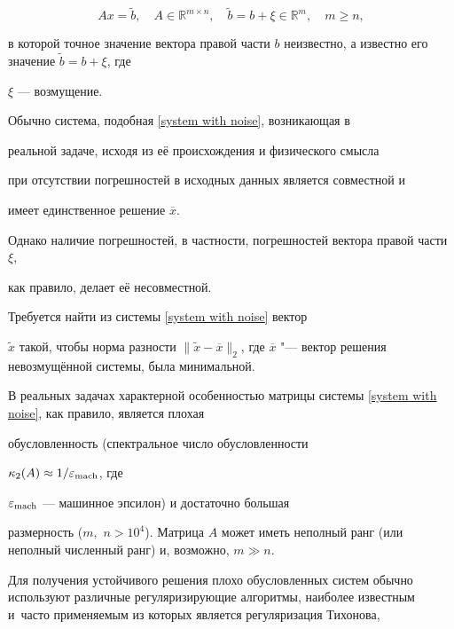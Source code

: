 \begin{equation}

\label{system with noise} Ax = \widetilde{b}, \quad A \in

{\mathbb{R}}^{m \times n}, \quad \widetilde{b} = b + \xi \in

{\mathbb{R}}^m, \quad m \geqslant n,

\end{equation}

в которой точное значение вектора правой части $b$ неизвестно, а известно его значение $\widetilde{b} = b + \xi$, где

$\xi$ --- возмущение.



Обычно система, подобная \eqref{system with noise}, возникающая в

реальной задаче, исходя из её происхождения и физического смысла

при отсутствии погрешностей в исходных данных является совместной и

имеет единственное решение $\overline{x}$. 

Однако наличие погрешностей, в частности, погрешностей вектора правой части $\xi$,

как правило, делает её несовместной.



Требуется найти из системы \eqref{system with noise} вектор

$\widetilde{x}$ такой, чтобы норма разности $\| \widetilde{x} -

\overline{x} \|_2$, где $\overline{x}$ "--- вектор решения невозмущённой системы, была минимальной.



В реальных задачах характерной особенностью матрицы системы \eqref{system with noise}, как правило, является плохая

обусловленность (спектральное число обусловленности~{\cite{dolishzhdanov:bib:beklemishev}}

${\kappa}_2(A) \approx 1 / {\varepsilon}_{\rm mach}$, где

${\varepsilon}_{\rm mach}$ --- машинное эпсилон) и достаточно большая

размерность ($m,$ $ n > 10^4$). Матрица $A$ может иметь неполный ранг (или неполный численный ранг) и, возможно, $m \gg n$.



Для получения устойчивого решения плохо обусловленных систем обычно используют различные регуляризирующие алгоритмы, наиболее известным и~часто применяемым из которых является регуляризация Тихонова,

